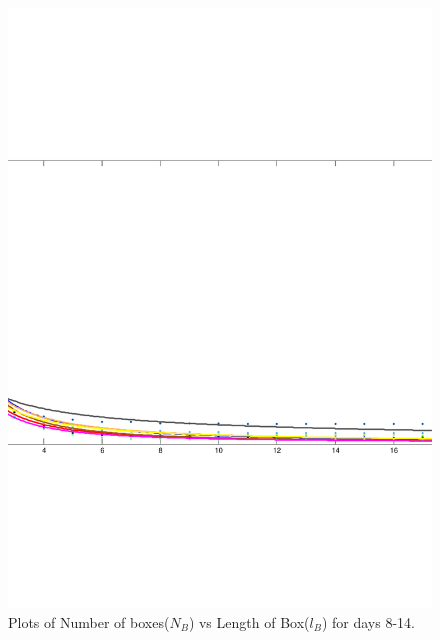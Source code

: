 \documentclass{article}
\begin{document}
\begin{figure}
\centering
\includegraphics[scale=0.3]{plot2/plot2}
\caption{Plots of Number of boxes($N_B$) vs Length of Box($l_B$) for days 8-14.}
\end{figure}
\end{document}
